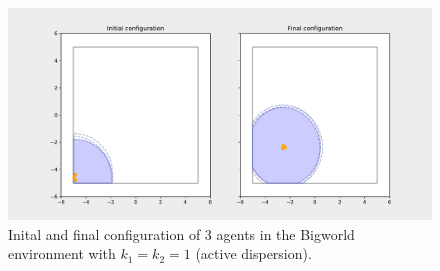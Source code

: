 \begin{figure}[H]
  \centering
  \includegraphics[width=\textwidth]{figs/bigworld_3_agnt_k_1_1_k_2_1_distr.pdf}
  \caption{Inital and final configuration of 3 agents in the Bigworld environment with $k_{1} = k_{2} = 1$ (active dispersion).}
  \label{fig:3_agnt_bw_k_1_1_k_2_1_distr}
\end{figure}
